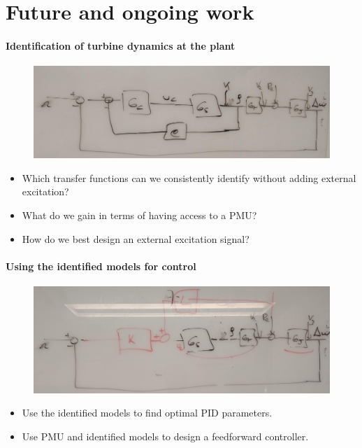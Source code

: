 \section{Future and ongoing work}
\begin{frame}{\secname}
		\framesubtitle{Identification of turbine dynamics at the plant}
		\begin{figure}
				\includegraphics[width=\textwidth]{./pictures/ident.jpg}
		\end{figure}
		\begin{itemize}
			\item Which transfer functions can we consistently identify without adding external excitation?
			\item What do we gain in terms of having access to a PMU?
			\item How do we best design an external excitation signal?
		\end{itemize}
\end{frame}

\begin{frame}{\secname}
		\framesubtitle{Using the identified models for control}
		\begin{figure}
				\includegraphics[width=\textwidth]{./pictures/control.jpg}
		\end{figure}
		\begin{itemize}
			\item Use the identified models to find optimal PID parameters.
			\item Use PMU and identified models to design a feedforward controller.
		\end{itemize}
\end{frame}
